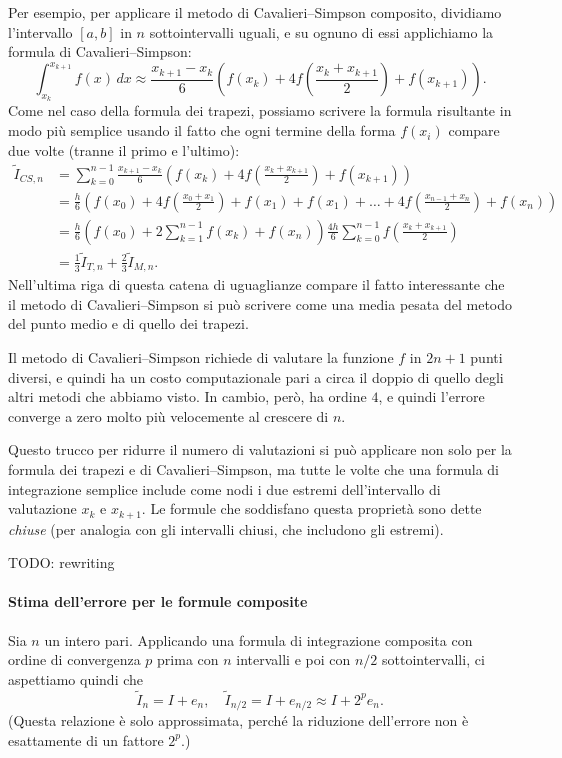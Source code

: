 \documentclass[a4paper]{report}
\theoremstyle{definiton}
\theoremstyle{remark}
\begin{document}
Per esempio, per applicare il metodo di Cavalieri--Simpson composito, dividiamo l'intervallo $[a,b]$ in $n$ sottointervalli uguali, e su ognuno di essi applichiamo la formula di Cavalieri--Simpson:
\[
\int_{x_k}^{x_{k+1}} f(x) \, dx \approx \frac{x_{k+1}-x_k}{6}\left(f(x_k)+4f\left(\frac{x_k+x_{k+1}}{2}\right) + f(x_{k+1})\right).
\]
Come nel caso della formula dei trapezi, possiamo scrivere la formula risultante in modo più semplice usando il fatto che ogni termine della forma $f(x_i)$ compare due volte (tranne il primo e l'ultimo):
\begin{align*}
    \tilde{I}_{CS,n} &= \sum_{k=0}^{n-1} \frac{x_{k+1}-x_k}{6}\left(f(x_k)+4f\left(\frac{x_k+x_{k+1}}{2}\right) + f(x_{k+1})\right)\\
    &= \frac{h}{6} \left( f(x_0) + 4f\left(\frac{x_0+x_1}{2}\right) + f(x_1) + f(x_1) + \dots + 4f\left(\frac{x_{n-1}+x_n}{2}\right) +  f(x_n)   \right)\\
    &= \frac{h}{6} \left(f(x_0) + 2\sum_{k=1}^{n-1}f(x_k) + f(x_n) \right) \frac{4h}{6} \sum_{k=0}^{n-1} f\left(\frac{x_{k}+x_{k+1}}{2}\right) \\
    &= \frac13 \tilde{I}_{T,n} +\frac{2}{3}\tilde{I}_{M,n}.
\end{align*}
Nell'ultima riga di questa catena di uguaglianze compare il fatto interessante che il metodo di Cavalieri--Simpson si può scrivere come una media pesata del metodo del punto medio e di quello dei trapezi.

Il metodo di Cavalieri--Simpson richiede di valutare la funzione $f$ in $2n+1$ punti diversi, e quindi ha un costo computazionale pari a circa il doppio di quello degli altri metodi che abbiamo visto. In cambio, però, ha ordine $4$, e quindi l'errore converge a zero molto più velocemente al crescere di $n$.

Questo trucco per ridurre il numero di valutazioni si può applicare non solo per la formula dei trapezi e di Cavalieri--Simpson, ma tutte le volte che una formula di integrazione semplice include come nodi i due estremi dell'intervallo di valutazione $x_k$ e $x_{k+1}$. Le formule che soddisfano questa proprietà sono dette \emph{chiuse} (per analogia con gli intervalli chiusi, che includono gli estremi).

TODO: rewriting

\paragraph{Stima dell'errore per le formule composite} Sia $n$ un intero pari. Applicando una formula di integrazione composita con ordine di convergenza $p$ prima con $n$ intervalli e poi con $n/2$ sottointervalli, ci aspettiamo quindi che
\[
    \tilde{I}_n = I + e_n, \quad \tilde{I}_{n/2} = I + e_{n/2} \approx I + 2^{p}e_n.
\]
(Questa relazione è solo approssimata, perché la riduzione dell'errore non è esattamente di un fattore $2^p$.)
\end{document}

